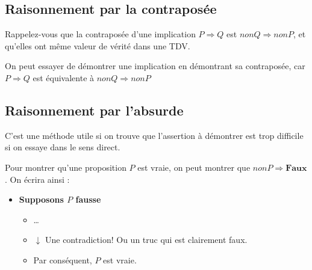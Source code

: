 \documentclass{article}
\begin{document}
\subsection{Raisonnement par la contraposée}

Rappelez-vous que la contraposée d'une implication $P \Rightarrow Q$ est $non Q \Rightarrow non P$, et qu'elles ont même valeur de vérité dans une TDV.

\begin{tcolorbox}[colback=green!5!white,colframe=green!75!black,title=Point méthode 4.10]

On peut essayer de démontrer une implication en démontrant sa contraposée, car $P \Rightarrow Q$ est équivalente à $non Q \Rightarrow non P$

\end{tcolorbox}


\begin{tcolorbox}[colback=cyan!5!white,colframe=cyan!75!black,title=Exercice]


\end{tcolorbox}



\subsection{Raisonnement par l'absurde}

C'est une méthode utile si on trouve que l'assertion à démontrer est trop difficile si on essaye dans le sens direct.

\begin{tcolorbox}[colback=green!5!white,colframe=green!75!black,title=Point méthode 4.11]

Pour montrer qu'une proposition $P$ est vraie, on peut montrer que \(nonP \Rightarrow \textbf{Faux}\). On écrira ainsi :

\begin{itemize}
    \item \textbf{Supposons \(P\) fausse}
    \begin{itemize}
        \item \dots
        \item \(\downarrow\) Une contradiction! Ou un truc qui est clairement faux.
        \item Par conséquent, \(P\) est vraie.
    \end{itemize}
\end{itemize}


\end{tcolorbox}
\end{document}
